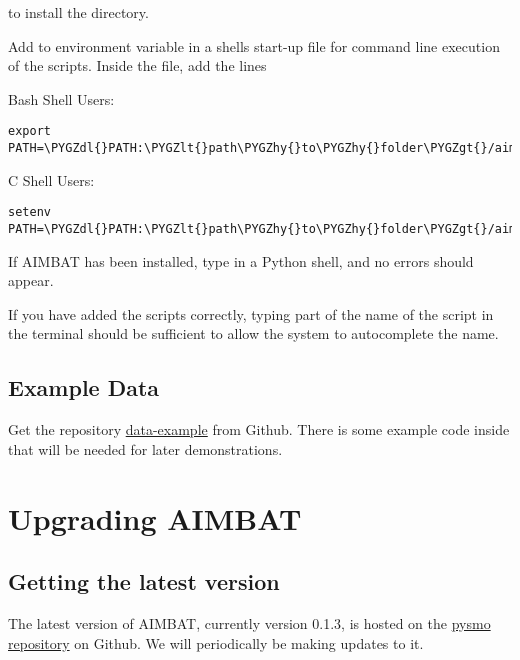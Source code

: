 \documentclass[letterpaper,10pt,english]{sphinxmanual}
\def\PYGZlt{\char`\<}
\def\PYGZgt{\char`\>}
\def\PYGZdl{\char`\$}
\def\PYGZhy{\char`\-}
\begin{document}
to install the  directory.

Add  to environment variable  in a shells start-up file for command line execution of the scripts. Inside the  file, add the lines

Bash Shell Users:

\begin{Verbatim}[commandchars=\\\{\}]
export PATH=\PYGZdl{}PATH:\PYGZlt{}path\PYGZhy{}to\PYGZhy{}folder\PYGZgt{}/aimbat/scripts
\end{Verbatim}

C Shell Users:

\begin{Verbatim}[commandchars=\\\{\}]
setenv PATH=\PYGZdl{}PATH:\PYGZlt{}path\PYGZhy{}to\PYGZhy{}folder\PYGZgt{}/aimbat/scripts
\end{Verbatim}

If AIMBAT has been installed, type  in a Python shell, and no errors should appear.

If you have added the scripts correctly, typing part of the name of the script in the terminal should be sufficient to allow the system to autocomplete the name.


\section{Example Data}
\label{docfiles/install_aimbat:example-data}
Get the repository \href{https://github.com/pysmo/data-example}{data-example} from Github. There is some example code inside  that will be needed for later demonstrations.


\chapter{Upgrading AIMBAT}
\label{docfiles/upgrading_aimbat:upgrading-aimbat}\label{docfiles/upgrading_aimbat::doc}

\section{Getting the latest version}
\label{docfiles/upgrading_aimbat:getting-the-latest-version}
The latest version of AIMBAT, currently version 0.1.3, is hosted on the \href{https://github.com/pysmo}{pysmo repository} on Github. We will periodically be making updates to it.
\end{document}
